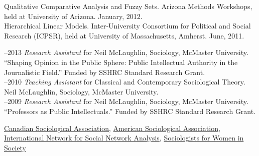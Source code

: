 \documentclass[9pt,usenames,dvipsnames]{article}
\begin{document}

\ind Qualitative Comparative Analysis and Fuzzy Sets. Arizona Methods Workshops, held at University of Arizona. January, 2012.\\

\ind Hierarchical Linear Models. Inter-University Consortium for Political and Social Research (ICPSR), held at University of Massachusetts, Amherst. June, 2011.\\


–2013 {\it Research Assistant} for Neil McLaughlin, Sociology, McMaster University. ``Shaping Opinion in the Public Sphere: Public Intellectual Authority in the Journalistic Field.'' Funded by SSHRC Standard Research Grant.\\

–2010 {\it Teaching Assistant} for Classical and Contemporary Sociological Theory. Neil McLaughlin, Sociology, McMaster University.\\

–2009 {\it Research Assistant} for Neil McLaughlin, Sociology, McMaster University.\\
``Professors as Public Intellectuals.'' Funded by SSHRC Standard Research Grant.\\





\noindent \href{http://www.csa-scs.ca}{Canadian Sociological Association}, \href{http://www.asanet.org}{American Sociological Association}, \href{http://www.insna.org}{International Network for Social Network Analysis}, \href{http://www.socwomen.org}{Sociologists for Women in Society} \\
\end{document}
